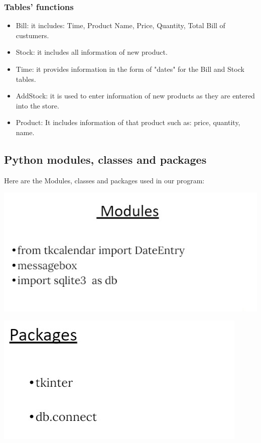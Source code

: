 \subsubsection{Tables’ functions}
\begin{itemize}
  \item Bill: it includes: Time, Product Name, Price, Quantity, Total Bill of custumers.
  \item Stock: it includes all information of new product.
  \item Time: it provides information in the form of "dates" for the Bill and Stock tables.
  \item AddStock: it is used to enter information of new products as they are entered into the store.
  \item Product: It includes information of that product such as: price, quantity, name.
\end{itemize}

\newpage
\subsection{Python modules, classes and packages}
\hspace{0.7cm}Here are the Modules, classes and packages used in our program:

\vspace{1cm}
\includegraphics{images/modules.jpg}



\includegraphics{images/packages.jpg}



